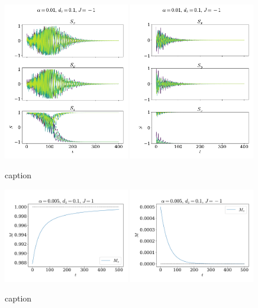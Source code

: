 \documentclass{article}
\begin{document}
    \begin{figure}[H]
        \centering
        \includegraphics[width=0.49\textwidth]{../plots/2225.pdf}
        \includegraphics[width=0.49\textwidth]{../plots/22252.pdf}
        \caption{caption}
        \label{one tilted dampend af}
    \end{figure}



    \begin{figure}[H]
        \centering
        \includegraphics[width=0.49\textwidth]{../plots/mag.pdf}
        \includegraphics[width=0.49\textwidth]{../plots/mag2.pdf}
        \caption{caption}
        \label{mag}
    \end{figure}
\end{document}
